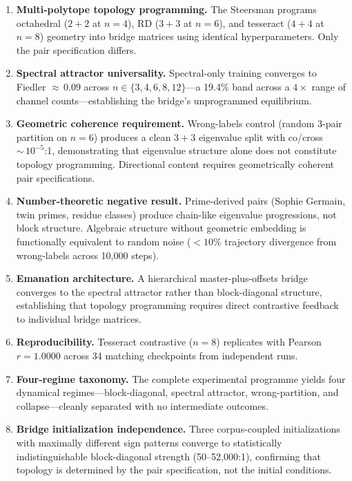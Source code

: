 \begin{enumerate}
  \item \textbf{Multi-polytope topology programming.} The Steersman
    programs octahedral ($2{+}2$ at $n{=}4$), RD ($3{+}3$ at $n{=}6$),
    and tesseract ($4{+}4$ at $n{=}8$) geometry into bridge matrices
    using identical hyperparameters. Only the pair specification differs.

  \item \textbf{Spectral attractor universality.} Spectral-only
    training converges to Fiedler ${\approx}\,0.09$ across
    $n \in \{3, 4, 6, 8, 12\}$---a 19.4\% band across a $4\times$
    range of channel counts---establishing the bridge's unprogrammed
    equilibrium.

  \item \textbf{Geometric coherence requirement.} Wrong-labels control
    (random 3-pair partition on $n{=}6$) produces a clean $3{+}3$
    eigenvalue split with co/cross~${\sim}\,10^{-5}$:1, demonstrating
    that eigenvalue structure alone does not constitute topology
    programming. Directional content requires geometrically coherent
    pair specifications.

  \item \textbf{Number-theoretic negative result.} Prime-derived pairs
    (Sophie Germain, twin primes, residue classes) produce chain-like
    eigenvalue progressions, not block structure. Algebraic structure
    without geometric embedding is functionally equivalent to random
    noise ($<10\%$ trajectory divergence from wrong-labels across
    10{,}000 steps).

  \item \textbf{Emanation architecture.} A hierarchical master-plus-offsets
    bridge converges to the spectral attractor rather than block-diagonal
    structure, establishing that topology programming requires direct
    contrastive feedback to individual bridge matrices.

  \item \textbf{Reproducibility.} Tesseract contrastive ($n{=}8$)
    replicates with Pearson $r = 1.0000$ across 34 matching checkpoints
    from independent runs.

  \item \textbf{Four-regime taxonomy.} The complete experimental
    programme yields four dynamical regimes---block-diagonal, spectral
    attractor, wrong-partition, and collapse---cleanly separated with no
    intermediate outcomes.

  \item \textbf{Bridge initialization independence.} Three corpus-coupled
    initializations with maximally different sign patterns converge to
    statistically indistinguishable block-diagonal strength
    (50--52{,}000:1), confirming that topology is determined by the pair
    specification, not the initial conditions.
\end{enumerate}

